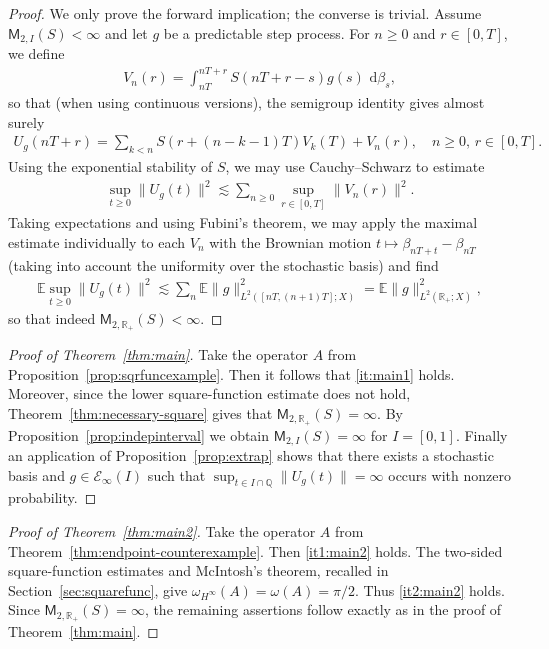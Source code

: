 \documentclass[11pt]{amsart}
\theoremstyle{definition}
\theoremstyle{remark}
\numberwithin{equation}{section}
\newcommand{\E}{\mathbb E}
\newcommand{\Q}{\mathbb Q}
\newcommand{\R}{\mathbb R}
\newcommand{\1}{\mathbf 1}
\newcommand{\cM}{\mathsf{M}}
\newcommand{\norm}[1]{\lVert #1\rVert}
\newcommand{\dd}{\,\mathrm d}
\begin{document}
\begin{proof}
We only prove the forward implication; the converse is trivial.
Assume $\cM_{2,I}(S) < \infty$ and let $g$ be a predictable step process.
For $n \geq 0$ and $r \in [0,T]$, we define
\begin{align}
    V_n(r)=\int_{nT}^{nT+r}S(nT+r-s)g(s)\,\dd\beta_s,
\end{align}
so that (when using continuous versions), the semigroup identity gives almost surely
\begin{align}
    U_g(nT + r) =\sum_{k < n} S(r + (n - k - 1)T)V_k(T) + V_n(r), \quad n \geq 0, \, r \in [0,T].
\end{align}
Using the exponential stability of $S$, we may use Cauchy--Schwarz to estimate
\begin{align}
    \sup_{t \geq 0}\norm{U_g(t)}^2 \lesssim \sum_{n\geq 0} \sup_{r \in [0,T]}\norm{V_n(r)}^2.
\end{align}
Taking expectations and using Fubini's theorem, we may
 apply the maximal estimate individually to each $V_n$ with the Brownian motion $t \mapsto \beta_{nT + t} - \beta_{nT}$ (taking into account the uniformity over the stochastic basis) and find
\begin{align}
    \E \sup_{t \geq 0}\norm{U_g(t)}^2 \lesssim \sum_{n}\E \norm{g}_{L^2([nT,(n+1)T];X)}^2 = \E\norm{g}_{L^2(\R_+;X)}^2,
\end{align}
so that indeed $\cM_{2,\R_+}(S) < \infty$.
\end{proof}



\begin{proof}[Proof of Theorem~\ref{thm:main}]
Take the operator $A$ from Proposition~\ref{prop:sqrfuncexample}.
Then it follows that \ref{it:main1} holds.
Moreover, since the lower square-function estimate does not hold, 
Theorem~\ref{thm:necessary-square} gives  that
$\cM_{2,\R_+}(S)=\infty$.
By Proposition~\ref{prop:indepinterval} we obtain $\cM_{2,I}(S)=\infty$ for $I = [0,1]$. Finally an application of Proposition~\ref{prop:extrap} shows that there exists a stochastic basis and $g\in \mathcal{E}_\infty(I)$ such that $\sup_{t \in I\cap \Q} \norm{U_g(t)} = \infty$ occurs with nonzero probability.  
\end{proof}

\begin{proof}[Proof of Theorem~\ref{thm:main2}]
Take the operator $A$ from Theorem~\ref{thm:endpoint-counterexample}.
Then \ref{it1:main2} holds. The two-sided square-function estimates and McIntosh's theorem,
recalled in Section~\ref{sec:squarefunc}, give
$\omega_{H^\infty}(A)=\omega(A)=\pi/2$.
Thus \ref{it2:main2} holds.
Since $\cM_{2,\R_+}(S)=\infty$, the remaining assertions follow
exactly as in the proof of Theorem~\ref{thm:main}.
\end{proof}
\end{document}
